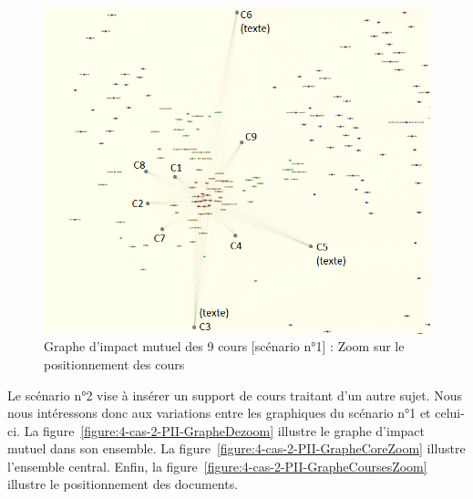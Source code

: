 \begin{figure}[htb!]
\centering
\centerline{  %
\includegraphics[scale=0.7]{4-Experiences/images/cas-1/graphe-Directe-core-courses-written.png}
}
\caption{Graphe d'impact mutuel des 9 cours [scénario n°1] : Zoom sur le positionnement des cours}
\label{figure:4-cas-1-PII-GrapheCoursesZoom}
\end{figure}




\clearpage %
\newpage   %



Le scénario n°2 vise à insérer un support de cours traitant d'un autre sujet.
Nous nous intéressons donc aux variations entre les graphiques du scénario n°1 et celui-ci.
La figure~\ref{figure:4-cas-2-PII-GrapheDezoom} illustre le graphe d'impact mutuel dans son ensemble.
La figure~\ref{figure:4-cas-2-PII-GrapheCoreZoom} illustre l'ensemble central.
Enfin, la figure~\ref{figure:4-cas-2-PII-GrapheCoursesZoom} illustre le positionnement des documents.

